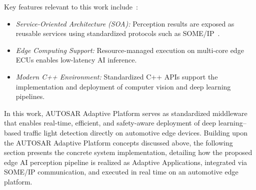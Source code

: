 Key features relevant to this work include~\cite{autosar_ap_platform_design_r21_11}:
\begin{itemize}
    \item \textit{Service-Oriented Architecture (SOA):} Perception results are exposed as reusable services using standardized protocols such as SOME/IP~\cite{autosar_someip_r21_11}.
    \item \textit{Edge Computing Support:} Resource-managed execution on multi-core edge ECUs enables low-latency AI inference.
    \item \textit{Modern C++ Environment:} Standardized C++ APIs support the implementation and deployment of computer vision and deep learning pipelines.
\end{itemize}

In this work, AUTOSAR Adaptive Platform serves as standardized middleware that enables real-time, efficient, and safety-aware deployment of deep learning--based traffic light detection directly on automotive edge devices. Building upon the AUTOSAR Adaptive Platform concepts discussed above, the following section presents the concrete system implementation, detailing how the proposed edge AI perception pipeline is realized as Adaptive Applications, integrated via SOME/IP communication, and executed in real time on an automotive edge platform.

